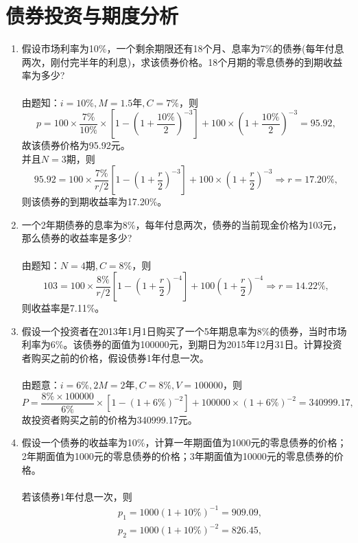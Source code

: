 \section{债券投资与期度分析}
\begin{enumerate}
    \item 假设市场利率为10\%，一个剩余期限还有18个月、息率为7\%的债券(每年付息两次，刚付完半年的利息)，求该债券价格。18个月期的零息债券的到期收益率为多少?\\
    \sol\\
    由题知：$i = 10\%, M = 1.5 \text{年}, C=7\%$，则
    \[p = 100\times \frac{7\%}{10\%} \times \left[1 - \left(1 + \frac{10\%}{2}\right)^{-3}\right]+100\times \left(1+\frac{10\%}{2}\right)^{-3}=95.92,\]
    故该债券价格为95.92元。\\
    并且$N = 3\text{期}$，则
    \[95.92 = 100 \times \frac{7\%}{r/2} \left[1 - \left(1 + \frac{r}{2}\right)^{-3}\right] + 100 \times \left(1 + \frac{r}{2}\right)^{-3} \Rightarrow r = 17.20\%,\]
    则该债券的到期收益率为17.20\%。
    \item 一个2年期债券的息率为8\%，每年付息两次，债券的当前现金价格为103元，那么债券的收益率是多少?\\
    \sol\\
    由题知：$N = 4 \text{期}, C=8\%$，则
    \[103 = 100 \times \frac{8\%}{r/2} \left[1 - \left(1 + \frac{r}{2}\right)^{-4}\right] + 100 \left(1 + \frac{r}{2}\right)^{-4} \Rightarrow r = 14.22\%,\]
    则收益率是7.11\%。
    \item 假设一个投资者在2013年1月1日购买了一个5年期息率为8\%的债券，当时市场利率为6\%。该债券的面值为100000元，到期日为2015年12月31日。计算投资者购买之前的价格，假设债券1年付息一次。\\
    \sol\\
    由题意：$i = 6\%, 2M = 2\text{年}, C=8\%, V= 100000$，则
    \[P = \frac{8\% \times 100000}{6\%} \times \left[1 - \left(1 + 6\%\right)^{-2}\right]+100000\times \left(1+6\%\right)^{-2}=340999.17,\]
    故投资者购买之前的价格为340999.17元。
    \item 假设一个债券的收益率为10\%，计算一年期面值为1000元的零息债券的价格；2年期面值为1000元的零息债券的价格；3年期面值为10000元的零息债券的价格。\\
    \sol\\
    若该债券1年付息一次，则
    \begin{align*}
        & p_1 = 1000(1 + 10\%)^{-1} = 909.09,\\
        & p_2 = 1000(1 + 10\%)^{-2} = 826.45,\\

\end{align*}
\end{enumerate}
